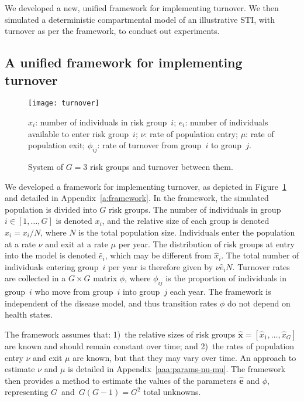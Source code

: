 We developed a new, unified framework for implementing turnover. 
We then simulated a deterministic compartmental model of an illustrative STI,
with turnover as per the framework,
to conduct out experiments.
\subsection{A unified framework for implementing turnover}
\label{ss:framework}
\begin{figure}
  \centerline{\texttt{[image: turnover]}}
  \caption{System of $G = 3$ risk groups and turnover between them.}
  \footnotesize
  $x_i$: number of individuals in risk group~$i$;
  $e_i$: number of individuals available to enter risk group~$i$;
  $\nu$: rate of population entry;
  $\mu$: rate of population exit;
  $\phi_{ij}$: rate of turnover from group~$i$ to group~$j$.
  \label{fig:system}
\end{figure}
We developed a framework for implementing turnover,  
as depicted in Figure~\ref{fig:system}
and detailed in Appendix~\ref{a:framework}. 
In the framework, the simulated population is divided into $G$ risk groups.
The number of individuals in group $i \in [1, \dots, G]$ is denoted $x_i$,
and the relative size of each group is denoted $\hat{x}_i = x_i / N$,
where $N$ is the total population size.
Individuals enter the population at a rate $\nu$ and exit at a rate $\mu$ per year.
The distribution of risk groups at entry into the model
is denoted $\hat{e}_i$, which may be different from $\hat{x}_i$.
The total number of individuals entering group~$i$ per year
is therefore given by $\nu \hat{e}_i N$.
Turnover rates are collected in a $G \times G$ matrix $\phi$,
where $\phi_{ij}$ is the proportion of individuals in group~$i$
who move from group~$i$ into group~$j$ each year.
The framework is independent of the disease model,
and thus transition rates $\phi$ do not depend on health states.
\par
The framework assumes that:
1)~the relative sizes of risk groups
$\bm{\hat{x}} = [\hat{x}_1, \dots, \hat{x}_G]$
are known and should remain constant over time; and
2)~the rates of population entry $\nu$ and exit $\mu$
are known, but that they may vary over time.
An approach to estimate $\nu$ and $\mu$ is detailed in Appendix~\ref{aaa:params-nu-mu}.
The framework then provides a method to estimate
the values of the parameters $\bm{\hat{e}}$ and $\phi$,
representing $G$~and~$G(G-1) = G^2$ total unknowns.
